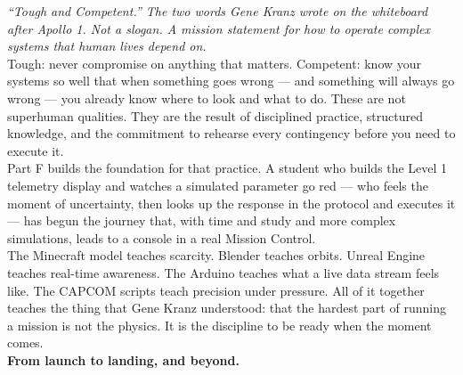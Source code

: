 \documentclass[11pt,letterpaper]{article}
\begin{document}
\begin{quotebox}
\textit{``Tough and Competent.'' The two words Gene Kranz wrote on the whiteboard after Apollo 1. Not a slogan. A mission statement for how to operate complex systems that human lives depend on.}\\[0.5em]
Tough: never compromise on anything that matters. Competent: know your systems so well that when something goes wrong --- and something will always go wrong --- you already know where to look and what to do. These are not superhuman qualities. They are the result of disciplined practice, structured knowledge, and the commitment to rehearse every contingency before you need to execute it.\\[0.5em]
Part F builds the foundation for that practice. A student who builds the Level 1 telemetry display and watches a simulated parameter go red --- who feels the moment of uncertainty, then looks up the response in the protocol and executes it --- has begun the journey that, with time and study and more complex simulations, leads to a console in a real Mission Control.\\[0.5em]
The Minecraft model teaches scarcity. Blender teaches orbits. Unreal Engine teaches real-time awareness. The Arduino teaches what a live data stream feels like. The CAPCOM scripts teach precision under pressure. All of it together teaches the thing that Gene Kranz understood: that the hardest part of running a mission is not the physics. It is the discipline to be ready when the moment comes.\\[0.5em]
\textbf{From launch to landing, and beyond.}
\end{quotebox}
\end{document}
